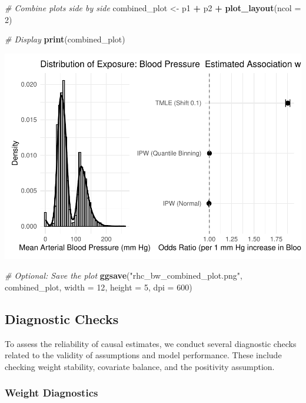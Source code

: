 \documentclass[
]{article}
\newenvironment{Shaded}{\begin{snugshade}}{\end{snugshade}}
\newcommand{\AttributeTok}[1]{\textcolor[rgb]{0.13,0.29,0.53}{#1}}
\newcommand{\CommentTok}[1]{\textcolor[rgb]{0.56,0.35,0.01}{\textit{#1}}}
\newcommand{\DecValTok}[1]{\textcolor[rgb]{0.00,0.00,0.81}{#1}}
\newcommand{\FunctionTok}[1]{\textcolor[rgb]{0.13,0.29,0.53}{\textbf{#1}}}
\newcommand{\NormalTok}[1]{#1}
\newcommand{\OtherTok}[1]{\textcolor[rgb]{0.56,0.35,0.01}{#1}}
\newcommand{\SpecialCharTok}[1]{\textcolor[rgb]{0.81,0.36,0.00}{\textbf{#1}}}
\newcommand{\StringTok}[1]{\textcolor[rgb]{0.31,0.60,0.02}{#1}}
\begin{document}
\begin{Shaded}
\begin{Highlighting}[]
\CommentTok{\# Combine plots side by side}
\NormalTok{combined\_plot }\OtherTok{\textless{}{-}}\NormalTok{ p1 }\SpecialCharTok{+}\NormalTok{ p2 }\SpecialCharTok{+} \FunctionTok{plot\_layout}\NormalTok{(}\AttributeTok{ncol =} \DecValTok{2}\NormalTok{)}

\CommentTok{\# Display}
\FunctionTok{print}\NormalTok{(combined\_plot)}
\end{Highlighting}
\end{Shaded}

\includegraphics{rhc_analysis_files/figure-latex/save-plot-1.pdf}

\begin{Shaded}
\begin{Highlighting}[]
\CommentTok{\# Optional: Save the plot}
\FunctionTok{ggsave}\NormalTok{(}\StringTok{"rhc\_bw\_combined\_plot.png"}\NormalTok{, combined\_plot, }\AttributeTok{width =} \DecValTok{12}\NormalTok{, }\AttributeTok{height =} \DecValTok{5}\NormalTok{, }\AttributeTok{dpi =} \DecValTok{600}\NormalTok{)}
\end{Highlighting}
\end{Shaded}

\subsection{Diagnostic Checks}\label{diagnostic-checks}

To assess the reliability of causal estimates, we conduct several
diagnostic checks related to the validity of assumptions and model
performance. These include checking weight stability, covariate balance,
and the positivity assumption.

\subsubsection{Weight Diagnostics}\label{weight-diagnostics}
\end{document}

